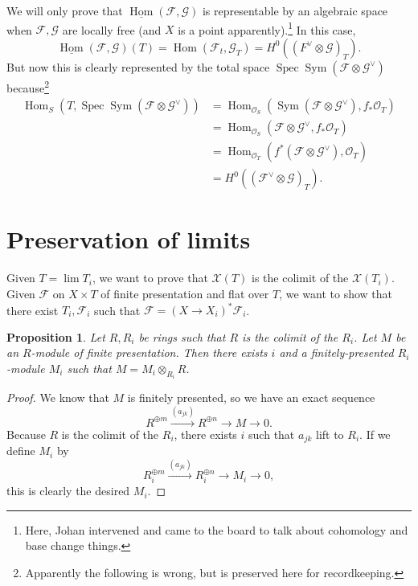 \documentclass[leqno, openany]{memoir}
\newtheorem{prop}[thm]{Proposition}
\theoremstyle{definition}
\theoremstyle{remark}
\theoremstyle{plain}
\theoremstyle{definition}
\theoremstyle{remark}
\newcommand{\mc}[1]{\mathcal{#1}}
\newcommand{\on}[1]{\operatorname{#1}}
\newcommand{\ul}[1]{\underline{#1}}
\DeclareMathOperator{\Hom}{Hom}
\DeclareMathOperator{\Spec}{Spec}
\begin{document}
We will only prove that $\ul{\Hom}(\mc{F}, \mc{G})$ is representable by an algebraic space when $\mc{F}, \mc{G}$ are locally free (and $X$ is a point apparently).\footnote{Here, Johan intervened and came to the board to talk about cohomology and base change things.} In this case, 
\[ \ul{\Hom}(\mc{F}, \mc{G})(T) = \Hom(\mc{F}_t, \mc{G}_T) = H^0((F^{\vee} \otimes \mc{G})_T). \]
But now this is clearly represented by the total space $\Spec \on{Sym}(\mc{F} \otimes \mc{G}^{\vee})$ because\footnote{Apparently the following is wrong, but is preserved here for recordkeeping.}
\begin{align*}
    \Hom_S(T, \Spec \on{Sym}(\mc{F \otimes \mc{G}^{\vee}})) &= \Hom_{\mc{O}_S}(\on{Sym}(\mc{F} \otimes \mc{G}^{\vee}), f_* \mc{O}_T) \\
    &= \Hom_{\mc{O}_S}(\mc{F} \otimes \mc{G}^{\vee}, f_* \mc{O}_T) \\
    &= \Hom_{\mc{O}_T}(f^*(\mc{F} \otimes \mc{G}^{\vee}), \mc{O}_T) \\
    &= H^0((\mc{F}^{\vee} \otimes \mc{G})_T).
\end{align*}

\section{Preservation of limits}%
\label{sec:preservation_of_limits}

Given $T = \lim T_i$, we want to prove that $\mc{X}(T)$ is the colimit of the $\mc{X}(T_i)$. Given $\mc{F}$ on $X \times T$ of finite presentation and flat over $T$, we want to show that there exist $T_i, \mc{F}_i$ such that $\mc{F} = (X \to X_i)^* \mc{F}_i$.

\begin{prop}
    Let $R, R_i$ be rings such that $R$ is the colimit of the $R_i$. Let $M$ be an $R$-module of finite presentation. Then there exists $i$ and a finitely-presented $R_i$-module $M_i$ such that $M = M_i \otimes_{R_i} R$.
\end{prop}

\begin{proof}
    We know that $M$ is finitely presented, so we have an exact sequence
    \[ R^{\oplus m} \xrightarrow{(a_{jk})} R^{\oplus n} \to M \to 0. \]
    Because $R$ is the colimit of the $R_i$, there exists $i$ such that $a_{jk}$ lift to $R_i$. If we define $M_i$ by
    \[ R_i^{\oplus m} \xrightarrow{(a_{jk})} R_i^{\oplus n} \to M_i \to 0, \]
    this is clearly the desired $M_i$.
\end{proof}
\end{document}
